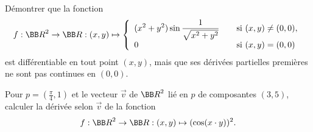 \documentclass[12pt,french,oneside,a4paper]{memoir} %
\begin{document}
\begin{exo}
Démontrer que la fonction
\begin{equation*}
f: {\BB R}^2\rightarrow\BB R :
(x,y)\mapsto \left\{
\begin{array}{ll}
\displaystyle{(x^2+y^2)\sin\frac{1}{\sqrt{x^2+y^2}}}\quad&\mbox{si
}(x,y)\neq(0,0),\\[2mm]
0&\mbox{si }(x,y)=(0,0)
\end{array}
\right.
\end{equation*}
est différentiable en tout point $(x,y)$, mais que ses
dérivées partielles premières ne sont pas continues en
$(0,0)$.
\end{exo}

\begin{exo}
Pour $\displaystyle{p=(\frac{\pi}{4},1)}$ et le vecteur $\vec{v}$ de ${\BB R}^2$ lié 
en $p$ de composantes $(3,5)$, calculer la dérivée selon $\vec{v}$ de la fonction
\begin{equation*}
f : {\BB R}^2 \rightarrow {\BB R} : (x,y) \mapsto (\cos(x \cdot y))^2.
\end{equation*}
\end{exo}
\end{document}
